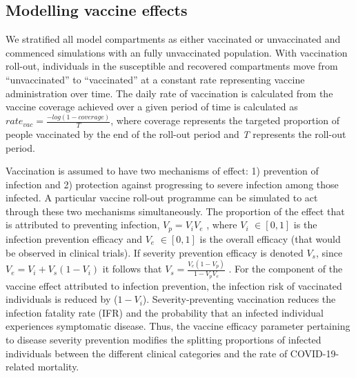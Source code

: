 \subsection{Modelling vaccine effects}
We stratified all model compartments as either vaccinated or unvaccinated and commenced simulations with an fully unvaccinated population. With vaccination roll-out, individuals in the susceptible and recovered compartments move from “unvaccinated” to “vaccinated” at a constant rate representing vaccine administration over time. The daily rate of vaccination is calculated from the vaccine coverage achieved over a given period of time is calculated as $rate_{vac} = \frac{-log(1-coverage)}{T}$, where coverage represents the targeted proportion of people vaccinated by the end of the roll-out period and \textit{T} represents the roll-out period.

Vaccination is assumed to have two mechanisms of effect: 1) prevention of infection and 2) protection against progressing to severe infection among those infected. A particular vaccine roll-out programme can be simulated to act through these two mechanisms simultaneously. The proportion of the effect that is attributed to preventing infection, $V_p = V_iV_e$ , where $V_i$ $\in [0,1]$ is the infection prevention efficacy and $V_e$ $\in [0,1]$ is the overall efficacy (that would be observed in clinical trials). If severity prevention efficacy is denoted $V_s$, since $V_e =V_i+V_s(1-V_i)$ it follows that $V_s =\frac {V_e(1-V_p)} {1- V_p V_e}$ . For the component of the vaccine effect attributed to infection prevention,
the infection risk of vaccinated individuals is reduced by ($1-V_i$). Severity-preventing vaccination reduces the infection fatality rate (IFR) and the probability that an infected individual experiences symptomatic disease. Thus, the vaccine efficacy parameter pertaining to disease severity prevention modifies the splitting proportions of infected individuals between the different clinical categories and the rate of COVID-19-related mortality.